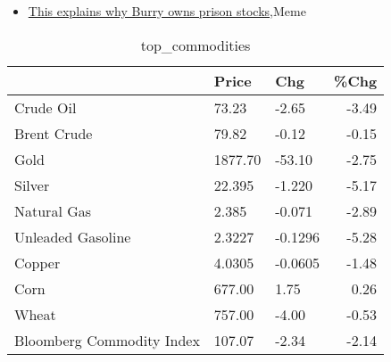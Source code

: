 \documentclass{article}%
\begin{document}
%
\begin{itemize}%
\item%
\href{https://reddit.com/r/wallstreetbets/comments/10t81us/this\_explains\_why\_burry\_owns\_prison\_stocks/}{This explains why Burry owns prison stocks},Meme%
\end{itemize}%


\begin{table}[htbp]%
\caption{top\_commodities}%
\centering%
\begin{adjustbox}{width=1\textwidth}%
\begin{tabular}{lllr}
\toprule
                          &   Price &     Chg &  \%Chg \\
\midrule
               Crude Oil  &   73.23 &   -2.65 & -3.49 \\
             Brent Crude  &   79.82 &   -0.12 & -0.15 \\
                    Gold  & 1877.70 &  -53.10 & -2.75 \\
                  Silver  &  22.395 &  -1.220 & -5.17 \\
             Natural Gas  &   2.385 &  -0.071 & -2.89 \\
       Unleaded Gasoline  &  2.3227 & -0.1296 & -5.28 \\
                  Copper  &  4.0305 & -0.0605 & -1.48 \\
                    Corn  &  677.00 &    1.75 &  0.26 \\
                   Wheat  &  757.00 &   -4.00 & -0.53 \\
Bloomberg Commodity Index &  107.07 &   -2.34 & -2.14 \\
\bottomrule
\end{tabular}
%
\end{adjustbox}%
\end{table}

%
\end{document}
